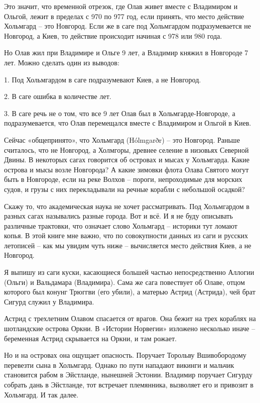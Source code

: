 Это значит, что временной отрезок, где Олав живет вместе с Владимиром и Ольгой, лежит в пределах с 970 по 977 год, если принять, что место действие Хольмгард – это Новгород. Если же в саге под Хольмгардом подразумевается не Новгород, а Киев, то действие происходит начиная с 978 или 980 года.

Но Олав жил при Владимире и Ольге 9 лет, а Владимир княжил в Новгороде 7 лет. Можно сделать один из выводов:

1. Под Хольмгардом в саге подразумевают Киев, а не Новгород.

2. В саге ошибка в количестве лет.

3. В саге речь не о том, что все 9 лет Олав был в Хольмгарде-Новгороде, а подразумевается, что Олав перемещался вместе с Владимиром и Ольгой в Киев.

Сейчас «общепринято», что Хольмгард (Hólmgarðr) – это Новгород. Раньше считалось, что не Новгород, а Холмгоры, древнее селение в низовьях Северной Двины. В некоторых сагах говорится об островах и мысах у Хольмгарда. Какие острова и мысы возле Новгорода? А какие зимовки флота Олава Святого могут быть в Новгороде, если на реке Волхов – пороги, непроходимые для морских судов, и грузы с них перекладывали на речные корабли с небольшой осадкой? 

Скажу то, что академическая наука не хочет рассматривать. Под Хольмгардом в разных сагах назывались разные города. Вот и всё. И я не буду описывать различные трактовки, что означает слово Хольмгард – историки тут ломают копья. В этой книге мне важно, что по совокупности данных из саги и русских летописей – как мы увидим чуть ниже – вычисляется место действия Киев, а не Новгород.

Я выпишу из саги куски, касающиеся большей частью непосредственно Аллогии (Ольги) и Вальдамара (Владимира). Сама же сага повествует об Олаве, отцом которого был конунг Трюггви (его убили), а матерью Астрид (Астрида), чей брат Сигурд служил у Владимира. 

Астрид с трехлетним Олавом спасается от врагов. Она бежит на трех кораблях на шотландские острова Оркни. В «Истории Норвегии» изложено несколько иначе – беременная Астрид скрывается на Оркни, и там рожает.

Но и на островах она ощущает опасность. Поручает Торольву Вшивобородому перевезти сына в Хольмгард. Однако по пути нападают викинги и мальчик становится рабом в Эйстланде, нынешней Эстонии. Владимир поручает Сигурду собрать дань в Эйстланде, тот встречает племянника, вызволяет его и привозит в Хольмгард. И так далее.

